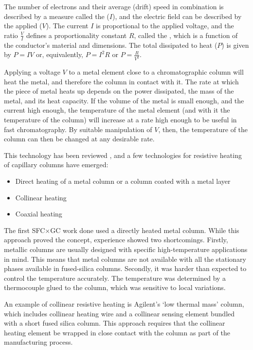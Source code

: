 The number of electrons and their average (drift) speed in combination is
described by a measure called the  (\(I\)), and the electric
field can be described by the applied  (\(V\)). The current
\(I\) is proportional to the applied voltage, and the ratio \(\frac{V}{I}\)
defines a proportionality constant \(R\), called the , which
is a function of the conductor's material and dimensions. The total
 dissipated to heat (\(P\)) is given by \(P=IV\) or,
equivalently, \(P=I^2R\) or \(P=\frac{R}{V^2}\).

Applying a voltage \(V\) to a metal element close to a chromatographic column
will heat the metal, and therefore the column in contact with it. The rate at
which the piece of metal heats up depends on the power dissipated, the mass of
the metal, and its heat capacity. If the volume of the metal is small enough,
and the current high enough, the temperature of the metal element (and with it
the temperature of the column) will increase at a rate high enough to be useful
in fast chromatography. By suitable manipulation of \(V\), then, the temperature
of the column can then be changed at any desirable rate.

This technology has been reviewed \autocite{Wang2012, Jacobs2013, Miranda2010},
and a few technologies for resistive heating of capillary columns have emerged:

\begin{itemize}
  \item Direct heating of a metal column or a column coated with a metal layer
  \item Collinear heating
  \item Coaxial heating
\end{itemize}

The first SFC×GC work done \autocite{Venter2004} used a directly heated metal
column. While this approach proved the concept, experience showed two
shortcomings. Firstly, metallic columns are usually designed with specific
high-temperature applications in mind. This means that metal columns are not
available with all the stationary phases available in fused-silica columns.
Secondly, it was harder than expected to control the temperature accurately. The
temperature was determined by a thermocouple glued to the column, which was
sensitive to local variations.

An example of collinear resistive heating is Agilent\texttrademark{}'s `low
thermal mass' column, which includes collinear heating wire and a collinear
sensing element bundled with a short fused silica column. This approach requires
that the collinear heating element be wrapped in close contact with the column
as part of the manufacturing process.

